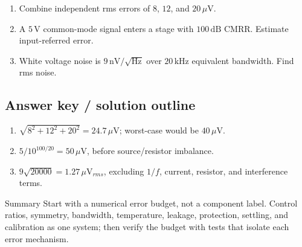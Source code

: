 \documentclass[10pt,letterpaper]{article}
\begin{document}
\begin{enumerate}
  \item Combine independent rms errors of $8$, $12$, and $20\,\mu\mathrm{V}$.
  \item A $5\,\mathrm{V}$ common-mode signal enters a stage with $100\,\mathrm{dB}$ CMRR. Estimate input-referred error.
  \item White voltage noise is $9\,\mathrm{nV}/\sqrt{\mathrm{Hz}}$ over $20\,\mathrm{kHz}$ equivalent bandwidth. Find rms noise.
\end{enumerate}\subsection{Answer key / solution outline}
\begin{enumerate}
  \item $\sqrt{8^2+12^2+20^2}=24.7\,\mu\mathrm{V}$; worst-case would be $40\,\mu\mathrm{V}$.
  \item $5/10^{100/20}=50\,\mu\mathrm{V}$, before source/resistor imbalance.
  \item $9\sqrt{20000}=1.27\,\mu\mathrm{V}_{rms}$, excluding $1/f$, current, resistor, and interference terms.
\end{enumerate}\begin{CornellSummaryBox}{Summary}
Start with a numerical error budget, not a component label. Control ratios, symmetry, bandwidth, temperature, leakage, protection, settling, and calibration as one system; then verify the budget with tests that isolate each error mechanism.
\end{CornellSummaryBox}
\end{document}
